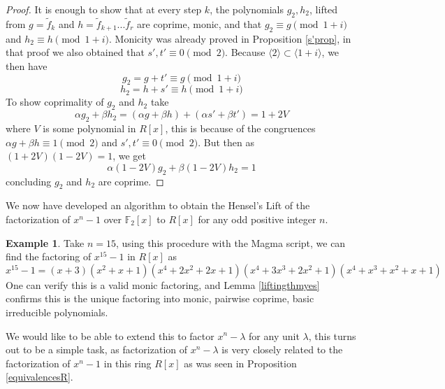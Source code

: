 \documentclass[a4paper, 12pt]{amsart}
\theoremstyle{definition}
\newtheorem{example}[lemma]{Example}
\newcommand{\F}{{\mathbb F}}
\newcommand{\id}[1]{\langle #1 \rangle}
\newcommand{\lm}{\lambda}
\numberwithin{equation}{section}
\numberwithin{table}{section}
\begin{document}
\begin{proof}
    It is enough to show that at every step $k$, the polynomials $g_2,h_2$, lifted from $g = \tilde f_k$ and $h = \tilde f_{k+1}...\tilde f_r$ are coprime, monic, and that $g_2 \equiv  g \pmod{1+i}$ and $h_2 \equiv h \pmod{1+i}$.
    Monicity was already proved in Proposition \ref{s'prop}, in that proof we also obtained that $s',t' \equiv 0 \pmod 2$. Because $\langle2 \rangle \subset \id{1+i}$, we then have
    \[g_2 = g+t' \equiv g\pmod{1+i}\]
    \[h_2 =h+s'\equiv h \pmod{1+i}\]
    To show coprimality of $g_2$ and $h_2$ take
    \[\alpha g_2+\beta h_2 = (\alpha g + \beta h) +(\alpha s' + \beta t') = 1+2V\]
    where $V$ is some polynomial in $R[x]$, this is because of the congruences $\alpha g + \beta h \equiv 1 \pmod2$ and $s',t' \equiv 0 \pmod 2$.
    But then as $(1+2V)(1-2V)=1$, we get
    \[\alpha(1-2V)g_2 + \beta(1-2V)h_2 = 1\]
    concluding $g_2$ and $h_2$ are coprime.
\end{proof}

We now have developed an algorithm to obtain the Hensel's Lift of the factorization of $x^n-1$ over $\F_2[x]$ to $R[x]$ for any odd positive integer $n$.

\begin{example}\label{lastrunning1}
    Take $n =15$, using this procedure with the Magma script, we can find the factoring of $x^{15}-1$ in $R[x]$ as
    \[x^{15}-1 = (x+3)(x^2+x+1)(x^4+2x^2+2x+1)(x^4+3x^3+2x^2+1)(x^4+x^3+x^2+x+1)\]
    One can verify this is a valid monic factoring, and Lemma \ref{liftingthmyes} confirms this is the unique factoring into monic, pairwise coprime, basic irreducible polynomials.
\end{example}

We would like to be able to extend this to factor $x^n-\lm$ for any unit $\lm$, this turns out to be a simple task, as factorization of $x^n-\lm$ is very closely related to the factorization of $x^n-1$ in this ring $R[x]$ as was seen in Proposition \ref{equivalencesR}.
\end{document}
